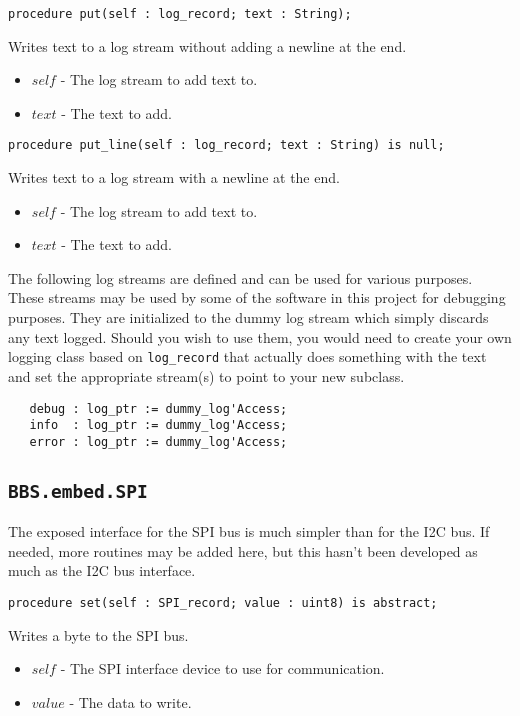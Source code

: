 \documentclass[10pt, openany]{book}
\newcommand{\indexfunc}[1]{\index[func]{#1}}
\newcommand{\package}[1]{\texttt{#1}}
\begin{document}
\begin{lstlisting}
procedure put(self : log_record; text : String);
\end{lstlisting}
\indexfunc{put}
Writes text to a log stream without adding a newline at the end.
\begin{itemize}
  \item $self$ - The log stream to add text to.
  \item $text$ - The text to add.
\end{itemize}

\begin{lstlisting}
procedure put_line(self : log_record; text : String) is null;
\end{lstlisting}
\indexfunc{put\_line}
Writes text to a log stream with a newline at the end.
\begin{itemize}
  \item $self$ - The log stream to add text to.
  \item $text$ - The text to add.
\end{itemize}

The following log streams are defined and can be used for various purposes.  These streams may be used by some of the software in this project for debugging purposes.  They are initialized to the dummy log stream which simply discards any text logged.  Should you wish to use them, you would need to create your own logging class based on \package{log\_record} that actually does something with the text and set the appropriate stream(s) to point to your new subclass.
\begin{lstlisting}
   debug : log_ptr := dummy_log'Access;
   info  : log_ptr := dummy_log'Access;
   error : log_ptr := dummy_log'Access;
\end{lstlisting}

\subsection{\package{BBS.embed.SPI}}
The exposed interface for the SPI bus is much simpler than for the I2C bus.  If needed, more routines may be added here, but this hasn't been developed as much as the I2C bus interface.
\begin{lstlisting}
procedure set(self : SPI_record; value : uint8) is abstract;
\end{lstlisting}
\indexfunc{set}
Writes a byte to the SPI bus.
\begin{itemize}
  \item $self$ - The SPI interface device to use for communication.
  \item $value$ - The data to write.
\end{itemize}
\end{document}
